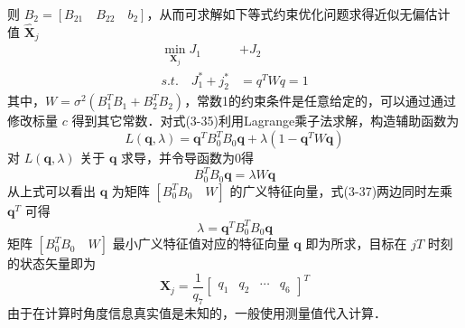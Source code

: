 则 $B_2 = [B_{21} \quad B_{22} \quad b_2]$，从而可求解如下等式约束优化问题求得近似无偏估计值 $\hat{\bm{X}}_j$ \vspace{-12pt}
\begin{equation}
	\begin{split}
		\min_{\bm{X}_j} J_1 &+ J_2 \\
		s.t. \quad J_1^* + j_2^* &= q^T W q =1
	\end{split}
\end{equation}
其中，$W = \sigma^2 (B_1^T B_1 + B_2^T B_2)$，常数1的约束条件是任意给定的，可以通过通过修改标量 $c$ 得到其它常数．对式(3-35)利用Lagrange乘子法求解，构造辅助函数为
\begin{equation}
	L(\bm{q},\lambda) = \bm{q}^T B_0^T B_0 \bm{q} + \lambda(1-\bm{q}^T W \bm{q})
\end{equation}
对 $L(\bm{q},\lambda)$ 关于 $\bm{q}$ 求导，并令导函数为0得
\begin{equation}
	B_0^T B_0 \bm{q} = \lambda W \bm{q}
\end{equation}
从上式可以看出 $\bm{q}$ 为矩阵 $[B_0^TB_0 \quad W]$ 的广义特征向量，式(3-37)两边同时左乘 $\bm{q}^T$ 可得
\begin{equation}
	\lambda = \bm{q}^T B_0^T B_0 \bm{q}
\end{equation}
矩阵 $[B_0^T B_0 \quad W]$ 最小广义特征值对应的特征向量 $\bm{q}$ 即为所求，目标在 $jT$ 时刻的状态矢量即为
\begin{equation}
	\bm{X}_j = \frac{1}{q_7}\left[\begin{array}{cccc}
		q_1 & q_2 & \cdots & q_6
	\end{array}\right] ^T
\end{equation}
由于在计算时角度信息真实值是未知的，一般使用测量值代入计算．